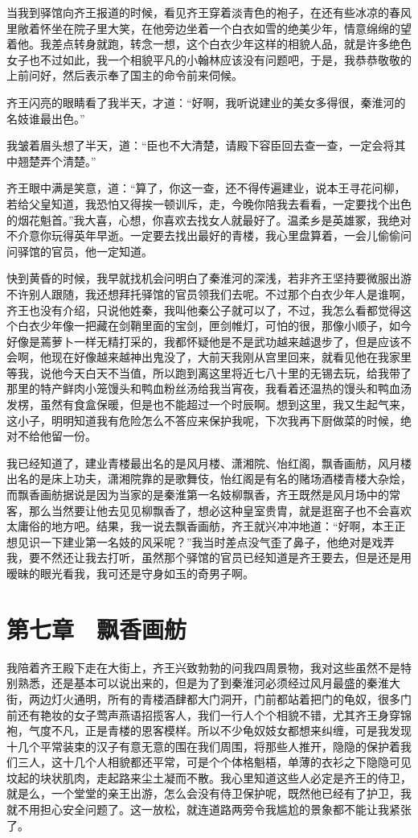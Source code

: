 当我到驿馆向齐王报道的时候，看见齐王穿着淡青色的袍子，在还有些冰凉的春风里敞着怀坐在院子里大笑，在他旁边坐着一个白衣如雪的绝美少年，情意绵绵的望着他。我差点转身就跑，转念一想，这个白衣少年这样的相貌人品，就是许多绝色女子也不过如此，我一个相貌平凡的小翰林应该没有问题吧，于是，我恭恭敬敬的上前问好，然后表示奉了国主的命令前来伺候。

齐王闪亮的眼睛看了我半天，才道：“好啊，我听说建业的美女多得很，秦淮河的名妓谁最出色。”

我皱着眉头想了半天，道：“臣也不大清楚，请殿下容臣回去查一查，一定会将其中翘楚弄个清楚。”

齐王眼中满是笑意，道：“算了，你这一查，还不得传遍建业，说本王寻花问柳，若给父皇知道，我恐怕又得挨一顿训斥，走，今晚你陪我去看看，一定要找个出色的烟花魁首。”我大喜，心想，你喜欢去找女人就最好了。温柔乡是英雄冢，我绝对不介意你玩得英年早逝。一定要去找出最好的青楼，我心里盘算着，一会儿偷偷问问驿馆的官员，他一定知道。

快到黄昏的时候，我早就找机会问明白了秦淮河的深浅，若非齐王坚持要微服出游不许别人跟随，我还想拜托驿馆的官员领我们去呢。不过那个白衣少年人是谁啊，齐王也没有介绍，只说他姓秦，我叫他秦公子就可以了，不过，我怎么看都觉得这个白衣少年像一把藏在剑鞘里面的宝剑，匣剑帷灯，可怕的很，那像小顺子，如今好像是蔫萝卜一样无精打采的，我都怀疑他是不是武功越来越退步了，但是应该不会啊，他现在好像越来越神出鬼没了，大前天我刚从宫里回来，就看见他在我家里等我，说他今天白天不当值，所以跑到离这里将近七八十里的无锡去玩，给我带了那里的特产鲜肉小笼馒头和鸭血粉丝汤给我当宵夜，我看着还温热的馒头和鸭血汤发楞，虽然有食盒保暖，但是也不能超过一个时辰啊。想到这里，我又生起气来，这小子，明明知道我有危险怎么不答应来保护我呢，下次我再下厨做菜的时候，绝对不给他留一份。

我已经知道了，建业青楼最出名的是风月楼、潇湘院、怡红阁，飘香画舫，风月楼出名的是床上功夫，潇湘院靠的是歌舞伎，怡红阁是有名的赌场酒楼青楼大杂烩，而飘香画舫据说是因为当家的是秦淮第一名妓柳飘香，齐王既然是风月场中的常客，那么当然要让他去见见柳飘香了，想必这种皇室贵胄，就是逛窑子也不会喜欢太庸俗的地方吧。结果，我一说去飘香画舫，齐王就兴冲冲地道：“好啊，本王正想见识一下建业第一名妓的风采呢？”我当时差点没气歪了鼻子，他绝对是戏弄我，要不然还让我去打听，虽然那个驿馆的官员已经知道是齐王要去，但是还是用暧昧的眼光看我，我可还是守身如玉的奇男子啊。

\chapter{第七章　飘香画舫}

我陪着齐王殿下走在大街上，齐王兴致勃勃的问我四周景物，我对这些虽然不是特别熟悉，还是基本可以说出来的，但是为了到秦淮河必须经过风月最盛的秦淮大街，两边灯火通明，所有的青楼酒肆都大门洞开，门前都站着把门的龟奴，很多门前还有艳妆的女子莺声燕语招揽客人，我们一行人个个相貌不错，尤其齐王身穿锦袍，气度不凡，正是青楼的恩客模样。所以不少龟奴妓女都想来纠缠，可是我发现十几个平常装束的汉子有意无意的围在我们周围，将那些人推开，隐隐的保护着我们三人，这十几个人相貌都还平常，可是个个体格魁梧，单薄的衣衫之下隐隐可见坟起的块状肌肉，走起路来尘土凝而不散。我心里知道这些人必定是齐王的侍卫，就是么，一个堂堂的亲王出游，怎么会没有侍卫保护呢，既然他已经有了护卫，我就不用担心安全问题了。这一放松，就连道路两旁令我尴尬的景象都不能让我紧张了。

